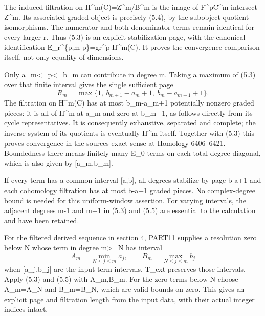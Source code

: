 The induced filtration on H\textasciicircum{}m(C)\allowbreak{}\allowbreak{}=Z\textasciicircum{}m/\allowbreak{}B\textasciicircum{}m is the image of F\^{}pC\^{}m intersect Z\^{}m. Its associated graded object is precisely (5.4)\allowbreak{},\allowbreak{} by the subobject-quotient isomorphisms. The numerator and both denominator terms remain identical for every larger r. Thus (5.3)\allowbreak{} is an explicit stabilization page,\allowbreak{} with the canonical identification E\_\allowbreak{}r\textasciicircum{}\{p,\allowbreak{}m-p\}\allowbreak{}=gr\textasciicircum{}p H\textasciicircum{}m(C)\allowbreak{}. It proves the convergence comparison itself,\allowbreak{} not only equality of dimensions.

Only a\_\allowbreak{}m<\allowbreak{}=p<\allowbreak{}=b\_\allowbreak{}m can contribute in degree m. Taking a maximum of (5.3)\allowbreak{} over that finite interval gives the single sufficient page \[
 R_m=\max\{1,\ b_{m+1}-a_m+1,\
                   b_m-a_{m-1}+1\}.                         \tag{5.5}
\] The filtration on H\textasciicircum{}m(C)\allowbreak{} has at most b\_\allowbreak{}m-a\_\allowbreak{}m\allowbreak{}+1 potentially nonzero graded pieces:\allowbreak{} it is all of H\^{}m at a\_\allowbreak{}m and zero at b\_\allowbreak{}m\allowbreak{}+1,\allowbreak{} as follows directly from its cycle representatives. It is consequently exhaustive,\allowbreak{} separated and complete; the inverse system of its quotients is eventually H\^{}m itself. Together with (5.3)\allowbreak{} this proves convergence in the source\textquotesingle s exact sense at Homology 6406–\allowbreak{}6421. Boundedness there means finitely many E\_\allowbreak{}0 terms on each total-degree diagonal,\allowbreak{} which is also given by [a\_\allowbreak{}m,\allowbreak{}b\_\allowbreak{}m]\allowbreak{}.

If every term has a common interval [a,\allowbreak{}b]\allowbreak{},\allowbreak{} all degrees stabilize by page b-a\allowbreak{}+1 and each cohomology filtration has at most b-a\allowbreak{}+1 graded pieces. No complex-degree bound is needed for this uniform-window assertion. For varying intervals,\allowbreak{} the adjacent degrees m-1 and m\allowbreak{}+1 in (5.3)\allowbreak{} and (5.5)\allowbreak{} are essential to the calculation and have been retained.

For the filtered derived sequence in section 4,\allowbreak{} PART11 supplies a resolution zero below N whose term in degree m>\allowbreak{}=N has interval \[
 A_m=\min_{N\le j\le m}a_j,\qquad
 B_m=\max_{N\le j\le m}b_j
                                                               \tag{5.6}
\] when [a\_\allowbreak{}j,\allowbreak{}b\_\allowbreak{}j]\allowbreak{} are the input term intervals. T\_\allowbreak{}ext preserves those intervals. Apply (5.3)\allowbreak{} and (5.5)\allowbreak{} with A\_\allowbreak{}m,\allowbreak{}B\_\allowbreak{}m. For the zero terms below N choose A\_\allowbreak{}m\allowbreak{}=A\_\allowbreak{}N and B\_\allowbreak{}m\allowbreak{}=B\_\allowbreak{}N,\allowbreak{} which are valid bounds on zero. This gives an explicit page and filtration length from the input data,\allowbreak{} with their actual integer indices intact.

